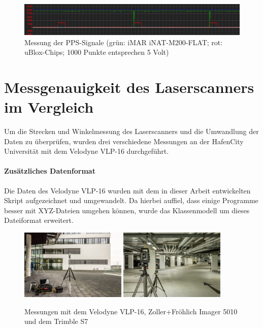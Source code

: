 \documentclass[a4paper,12pt,bibliography=totoc, listof=totoc,titlepage,pointlessnumbers]{scrreprt}
\begin{document}
\begin{figure}[!ht]
 \centering
 \includegraphics[width=1\textwidth]{./img/osziPPS.png}
 \caption{Messung der PPS-Signale (grün: iMAR iNAT-M200-FLAT; rot: uBlox-Chips; 1000 Punkte entsprechen 5 Volt)}
 \label{img:osPPS}
\end{figure}

\section{Messgenauigkeit des Laser\-scan\-ners im Vergleich}
Um die Strecken und Winkelmessung des Laser\-scan\-ners und die Umwandlung der Daten zu überprüfen, wurden drei verschiedene Messungen an der HafenCity Universität mit dem Velodyne VLP-16 durchgeführt. 

\paragraph{Zusätzliches Datenformat}
Die Daten des Velodyne VLP-16 wurden mit dem in dieser Arbeit entwickelten Skript aufgezeichnet und umgewandelt. Da hierbei auffiel, dass einige Programme besser mit XYZ-Dateien umgehen können, wurde das Klassenmodell um dieses Dateiformat erweitert.

\begin{figure}[!ht]
 \centering
 \includegraphics[width=0.45\textwidth]{./img/fassade.jpg}
 \includegraphics[width=0.45\textwidth]{./img/tiefgarage.jpg}
 \caption{Messungen mit dem Velodyne VLP-16, Zoller+Fröhlich Imager 5010 und dem Trimble S7}
 \label{img:messbilder}
\end{figure}
\end{document}

